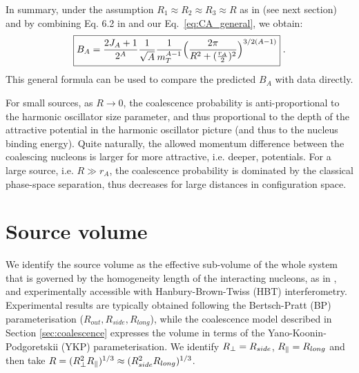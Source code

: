 In summary, under the assumption $R_1\approx R_2 \approx R_3 \approx R$ as in \cite{Blum:2017qnn} (see next section) and by combining Eq. 6.2 in \cite{Scheibl:1998tk} and our Eq.~\ref{eq:CA_general}, we obtain:
%
\begin{equation}
	\boxed {  B_{A} = {2J_{A} + 1 \over 2^{A}} {1 \over \sqrt{A}} {1 \over m_{T}^{A-1}} \Bigl({2\pi \over R^2 + ({r_A \over 2})^2 }\Bigr)^{3/2(A-1)} } \;.
\end{equation}
%
This general formula can be used to compare the predicted $B_{A}$ with data directly.
 
For small sources, as $R \rightarrow 0$, the coalescence probability is anti-proportional to the harmonic oscillator size parameter, and thus proportional to the depth of the attractive potential in the harmonic oscillator picture (and thus to the nucleus binding energy).
Quite naturally, the allowed momentum difference between the coalescing nucleons is larger for more attractive, i.e. deeper, potentials. 
For a large source, i.e. $R \gg r_A$, the coalescence probability is dominated by the classical phase-space separation, thus decreases for large distances in configuration space. 
%

\section{Source volume} \label{SecSourceVolume}
We identify the source volume as the effective sub-volume of the whole system that is governed by the homogeneity length of the interacting nucleons, as in \cite{Scheibl:1998tk}, and experimentally accessible with Hanbury-Brown-Twiss (HBT) interferometry. 
Experimental results are typically obtained following the Bertsch-Pratt (BP) parameterisation ($R_{out}, R_{side}, R_{long}$), while the coalescence model described in Section \ref{sec:coalescence} expresses the volume in terms of the Yano-Koonin-Podgoretskii (YKP) parameterisation. 
We identify $R_{\perp} = R_{side}$, $R_{\|} = R_{long}$ and then take $R = (R_{\perp}^{2}R_{\|})^{1/3} \approx (R_{side}^{2}R_{long})^{1/3}$.

